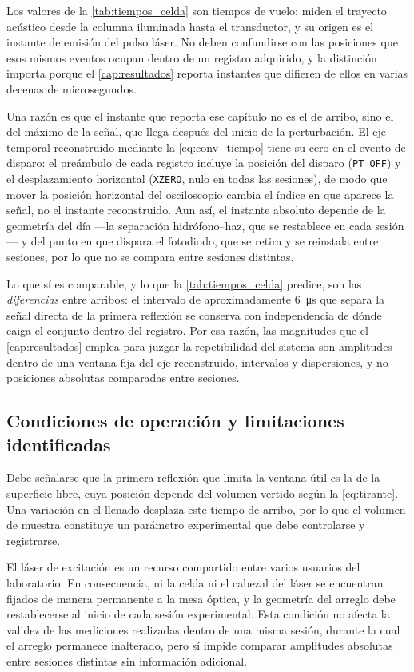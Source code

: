 Los valores de la \cref{tab:tiempos_celda} son tiempos de vuelo:
miden el trayecto acústico desde la columna iluminada hasta el
transductor, y su origen es el instante de emisión del pulso láser. No
deben confundirse con las posiciones que esos mismos eventos ocupan
dentro de un registro adquirido, y la distinción importa porque el
\cref{cap:resultados} reporta instantes que difieren de ellos en varias
decenas de microsegundos.

Una razón es que el instante que reporta ese capítulo no es el de
arribo, sino el del máximo de la señal, que llega después del inicio de
la perturbación. El eje temporal reconstruido mediante la
\cref{eq:conv_tiempo} tiene su cero en el evento de disparo: el
preámbulo de cada registro incluye la posición del disparo
(\texttt{PT\_OFF}) y el desplazamiento horizontal (\texttt{XZERO}, nulo
en todas las sesiones), de modo que mover la posición horizontal del
osciloscopio cambia el índice en que aparece la señal, no el instante
reconstruido. Aun así, el instante absoluto depende de la geometría del
día ---la separación hidrófono--haz, que se restablece en cada
sesión--- y del punto en que dispara el fotodiodo, que se retira y se
reinstala entre sesiones, por lo que no se compara entre sesiones
distintas.

Lo que sí es comparable, y lo que la \cref{tab:tiempos_celda} predice,
son las \emph{diferencias} entre arribos: el intervalo de
aproximadamente \SI{6}{\micro\second} que separa la señal directa de
la primera reflexión se conserva con independencia de dónde caiga el
conjunto dentro del registro. Por esa razón, las magnitudes que el
\cref{cap:resultados} emplea para juzgar la repetibilidad del sistema
son amplitudes dentro de una ventana fija del eje reconstruido,
intervalos y dispersiones, y no posiciones absolutas comparadas entre
sesiones.

\subsection*{Condiciones de operación y limitaciones identificadas}

Debe señalarse que la primera reflexión que limita la ventana útil es
la de la superficie libre, cuya posición depende del volumen vertido
según la \cref{eq:tirante}. Una variación en el llenado desplaza este
tiempo de arribo, por lo que el volumen de muestra constituye un
parámetro experimental que debe controlarse y registrarse.

El láser de excitación es un recurso compartido entre varios usuarios
del laboratorio. En consecuencia, ni la celda ni el cabezal del láser
se encuentran fijados de manera permanente a la mesa óptica, y la
geometría del arreglo debe restablecerse al inicio de cada sesión
experimental. Esta condición no afecta la validez de las mediciones
realizadas dentro de una misma sesión, durante la cual el arreglo
permanece inalterado, pero sí impide comparar amplitudes absolutas
entre sesiones distintas sin información adicional.

